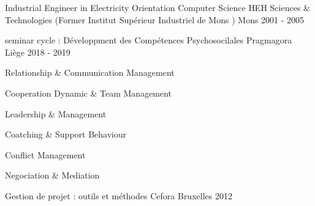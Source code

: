 

\begin{cventries}

  \cventry
    {Industrial Engineer in Electricity Orientation Computer Science
} %
    {HEH Sciences \& Technologies (Former  \og Institut Supérieur Industriel de Mons \fg)} %
    {Mons} %
    {2001 - 2005} %
    {
    }

\cventry
    {seminar cycle : \og Développment des Compétences Psychosocilales \fg} %
    {Pragmagora} %
    {Liège} %
    {2018 - 2019} %
    {
      \begin{cvitems} %
        \item {Relationship \& Communication Management}
        \item {Cooperation Dynamic \& Team Management}        
        \item {Leadership \& Management}
        \item {Coatching \& Support Behaviour}
        \item {Conflict Management}        
        \item {Negociation \& Mediation}
      \end{cvitems}
    }

\cventry
    {Gestion de projet : outils et méthodes
} %
    {Cefora} %
    {Bruxelles} %
    {2012} %
    {
    }


\end{cventries}
